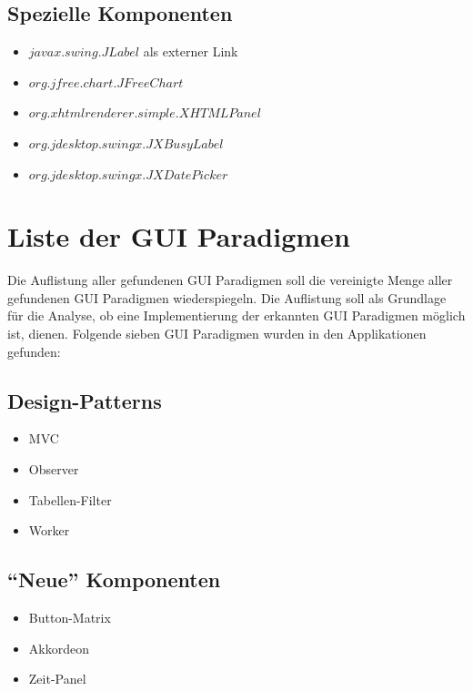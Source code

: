   \subsection{Spezielle Komponenten}
  
  \begin{itemize}
    \item \(javax.swing.JLabel\) als externer Link
    \item \(org.jfree.chart.JFreeChart\)
    \item \(org.xhtmlrenderer.simple.XHTMLPanel\)
    \item \(org.jdesktop.swingx.JXBusyLabel\)
    \item \(org.jdesktop.swingx.JXDatePicker\)
  \end{itemize}
  
  \section{Liste der GUI Paradigmen}
  
  Die Auflistung aller gefundenen GUI Paradigmen soll die vereinigte Menge aller
  gefundenen GUI Paradigmen wiederspiegeln. Die Auflistung soll als Grundlage für
  die Analyse, ob eine Implementierung der erkannten GUI Paradigmen möglich
  ist, dienen. Folgende sieben GUI Paradigmen wurden in den Applikationen
  gefunden:
      
  \subsection{Design-Patterns}
  
  \begin{itemize}
    \item MVC
    \item Observer
    \item Tabellen-Filter
    \item Worker
  \end{itemize}
  
  \subsection{``Neue'' Komponenten}
  
  \begin{itemize}
    \item Button-Matrix
    \item Akkordeon
    \item Zeit-Panel
  \end{itemize}